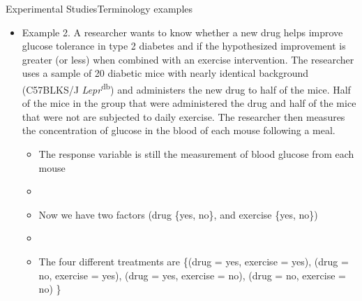 \documentclass[xcolor=dvipsnames]{beamer}
\begin{document}
\begin{frame}{Experimental Studies}{Terminology examples}
\begin{itemize}
	\item Example 2. A researcher wants to know whether a new drug helps improve glucose tolerance in type 2 diabetes and if the hypothesized improvement is greater (or less) when combined with an exercise intervention. The researcher uses a sample of 20 diabetic mice with nearly identical background (C57BLKS/J \emph{Lepr}\textsuperscript{db}) and administers the new drug to half of the mice. Half of the mice in the group that were administered the drug and half of the mice that were not are subjected to daily exercise. The researcher then measures the concentration of glucose in the blood of each mouse following a meal. \pause
	\begin{itemize}
		\item The response variable is still the measurement of blood glucose from each mouse \pause
		\item[]
		\item Now we have two factors (drug \{yes, no\}, and exercise \{yes, no\}) \pause
		\item[]
		\item The four different treatments are \{(drug = yes, exercise = yes), (drug = no, exercise = yes), (drug = yes, exercise = no), (drug = no, exercise = no) \} \pause
	\end{itemize}
\end{itemize}
\end{frame}
\end{document}
